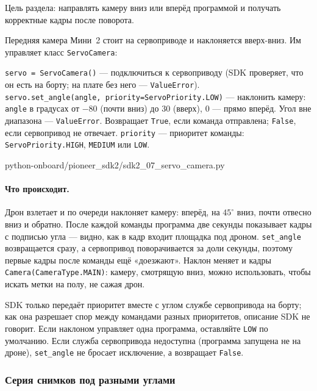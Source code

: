 Цель раздела: направлять камеру вниз или вперёд программой и получать корректные кадры после поворота.

Передняя камера Мини~2 стоит на сервоприводе и наклоняется вверх-вниз. Им управляет класс \verb|ServoCamera|:

\begin{codebox}[ServoCamera]
\verb|servo = ServoCamera()| --- подключиться к сервоприводу (SDK проверяет, что он есть на борту; на плате без него --- \verb|ValueError|).\\
\verb|servo.set_angle(angle, priority=ServoPriority.LOW)| --- наклонить камеру: \verb|angle| в градусах от $-80$ (почти вниз) до $30$ (вверх), $0$ --- прямо вперёд. Угол вне диапазона --- \verb|ValueError|. Возвращает \verb|True|, если команда отправлена; \verb|False|, если сервопривод не отвечает. \verb|priority| --- приоритет команды: \verb|ServoPriority.HIGH|, \verb|MEDIUM| или \verb|LOW|.
\end{codebox}

\begin{codefile}[python]{python-onboard/pioneer_sdk2/sdk2_07_servo_camera.py}
\end{codefile}

\paragraph{Что происходит.} Дрон взлетает и по очереди наклоняет камеру: вперёд, на $45^\circ$ вниз, почти отвесно вниз и обратно. После каждой команды программа две секунды показывает кадры с подписью угла --- видно, как в кадр входит площадка под дроном. \verb|set_angle| возвращается сразу, а сервопривод поворачивается за доли секунды, поэтому первые кадры после команды ещё «доезжают». Наклон меняет и кадры \verb|Camera(CameraType.MAIN)|: камеру, смотрящую вниз, можно использовать, чтобы искать метки на полу, не сажая дрон.

SDK только передаёт приоритет вместе с углом службе сервопривода на борту; как она разрешает спор между командами разных приоритетов, описание SDK не говорит. Если наклоном управляет одна программа, оставляйте \verb|LOW| по умолчанию. Если служба сервопривода недоступна (программа запущена не на дроне), \verb|set_angle| не бросает исключение, а возвращает \verb|False|.

\subsubsection*{Серия снимков под разными углами}

